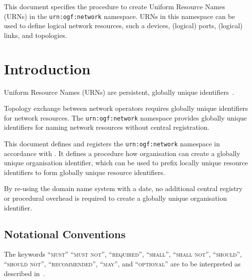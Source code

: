 \documentclass[12pt]{article}  %
\begin{document}
This document specifies the procedure to create Uniform Resource Names (URNs) in the \texttt{urn:ogf:network} namespace. URNs in this namespace can be used to define logical network resources, such a devices, (logical) ports, (logical) links, and topologies.

\tableofcontents

\newpage

\section{Introduction}%
\label{sec:introduction}

Uniform Resource Names (URNs) are persistent, globally unique identifiers~\cite{rfc2141}.

Topology exchange between network operators requires globally unique identifiers for network resources.  The \texttt{urn:ogf:network} namespace provides globally unique identifiers for naming network resources without central registration.

This document defines and registers the \texttt{urn:ogf:network} namespace in accordance with \cite{urn-ogf-procedure}.  It defines a procedure how organisation can create a globally unique organisation identifier, which can be used to prefix locally unique resource identifiers to form globally unique resource identifiers.

By re-using the domain name system with a date, no additional central registry or procedural overhead is required to create a globally unique organisation identifier.


\subsection*{Notational Conventions}
\label{sec:rfc2119}

\newcommand{\MUST}{\textsc{must}}
\newcommand{\MUSTNOT}{\textsc{must not}}
\newcommand{\REQUIRED}{\textsc{required}}
\newcommand{\SHALL}{\textsc{shall}}
\newcommand{\SHALLNOT}{\textsc{shall not}}
\newcommand{\SHOULD}{\textsc{should}}
\newcommand{\SHOULDNOT}{\textsc{should not}}
\newcommand{\RECOMMENDED}{\textsc{recommended}}
\newcommand{\NOTRECOMMENDED}{\textsc{not recommended}}
\newcommand{\MAY}{\textsc{may}}
\newcommand{\OPTIONAL}{\textsc{optional}}

The keywords “\MUST{}” “\MUSTNOT{}”, “\REQUIRED{}”, “\SHALL{}”, “\SHALLNOT{}”, “\SHOULD{}”, “\SHOULDNOT{}”, “\RECOMMENDED{}”, “\MAY{}”,  and “\OPTIONAL{}” are to be interpreted as described in~\cite{rfc2119}.
\end{document}
